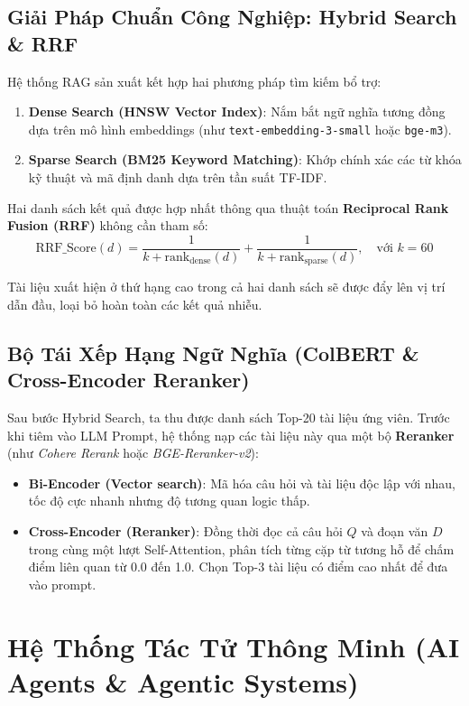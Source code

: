 \subsection{Giải Pháp Chuẩn Công Nghiệp: Hybrid Search \& RRF}
Hệ thống RAG sản xuất kết hợp hai phương pháp tìm kiếm bổ trợ:
\begin{enumerate}
    \item \textbf{Dense Search (HNSW Vector Index)}: Nắm bắt ngữ nghĩa tương đồng dựa trên mô hình embeddings (như \texttt{text-embedding-3-small} hoặc \texttt{bge-m3}).
    \item \textbf{Sparse Search (BM25 Keyword Matching)}: Khớp chính xác các từ khóa kỹ thuật và mã định danh dựa trên tần suất TF-IDF.
\end{enumerate}

Hai danh sách kết quả được hợp nhất thông qua thuật toán \textbf{Reciprocal Rank Fusion (RRF)} không cần tham số:
\begin{equation}
\text{RRF\_Score}(d) = \frac{1}{k + \text{rank}_{\text{dense}}(d)} + \frac{1}{k + \text{rank}_{\text{sparse}}(d)}, \quad \text{với } k = 60
\end{equation}

Tài liệu xuất hiện ở thứ hạng cao trong cả hai danh sách sẽ được đẩy lên vị trí dẫn đầu, loại bỏ hoàn toàn các kết quả nhiễu.

\subsection{Bộ Tái Xếp Hạng Ngữ Nghĩa (ColBERT \& Cross-Encoder Reranker)}
Sau bước Hybrid Search, ta thu được danh sách Top-20 tài liệu ứng viên. Trước khi tiêm vào LLM Prompt, hệ thống nạp các tài liệu này qua một bộ \textbf{Reranker} (như \textit{Cohere Rerank} hoặc \textit{BGE-Reranker-v2}):
\begin{itemize}
    \item \textbf{Bi-Encoder (Vector search)}: Mã hóa câu hỏi và tài liệu độc lập với nhau, tốc độ cực nhanh nhưng độ tương quan logic thấp.
    \item \textbf{Cross-Encoder (Reranker)}: Đồng thời đọc cả câu hỏi $Q$ và đoạn văn $D$ trong cùng một lượt Self-Attention, phân tích từng cặp từ tương hỗ để chấm điểm liên quan từ 0.0 đến 1.0. Chọn Top-3 tài liệu có điểm cao nhất để đưa vào prompt.
\end{itemize}

\section{Hệ Thống Tác Tử Thông Minh (AI Agents \& Agentic Systems)}

